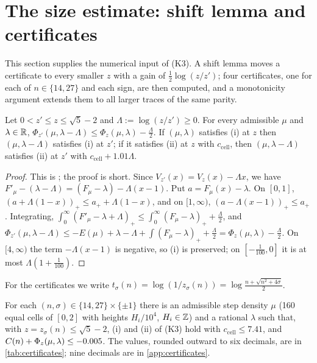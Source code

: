 \section{The size estimate: shift lemma and certificates}\label{sec:size}

This section supplies the numerical input of (K3). A shift lemma moves a certificate to every smaller $z$
with a gain of $\frac12\log(z/z')$; four certificates, one for each of $n\in\{14,27\}$ and each sign,
are then computed, and a monotonicity argument extends them to all larger traces of the same parity.

\begin{lemma}\label{lem:shift}
Let $0<z'\le z\le\sqrt5-2$ and $\Lambda:=\log(z/z')\ge0$. For every admissible $\mu$ and $\lambda\in\mathbb{R}$,
$\Phi_{z'}(\mu,\lambda-\Lambda)\le\Phi_z(\mu,\lambda)-\frac\Lambda2$. If $(\mu,\lambda)$ satisfies (i) at $z$ then
$(\mu,\lambda-\Lambda)$ satisfies (i) at $z'$; if it satisfies (ii) at $z$ with $c_{\mathrm{cell}}$, then
$(\mu,\lambda-\Lambda)$ satisfies (ii) at $z'$ with $c_{\mathrm{cell}}+1.01\Lambda$.
\end{lemma}

\begin{proof}
This is \cite[Lemma~5.5]{Krisman2026units}; the proof is short. Since $V_{z'}(x)=V_z(x)-\Lambda x$, we have
$F'_\mu-(\lambda-\Lambda)=(F_\mu-\lambda)-\Lambda(x-1)$. Put $a=F_\mu(x)-\lambda$. On $[0,1]$,
$(a+\Lambda(1-x))_+\le a_++\Lambda(1-x)$, and on $[1,\infty)$, $(a-\Lambda(x-1))_+\le a_+$. Integrating,
$\int_0^\infty(F'_\mu-\lambda+\Lambda)_+\le\int_0^\infty(F_\mu-\lambda)_++\frac\Lambda2$, and
$\Phi_{z'}(\mu,\lambda-\Lambda)\le-E(\mu)+\lambda-\Lambda+\int(F_\mu-\lambda)_++\frac\Lambda2=\Phi_z(\mu,\lambda)-\frac\Lambda2$.
On $[4,\infty)$ the term $-\Lambda(x-1)$ is negative, so (i) is preserved; on $[-\frac1{100},0]$ it is at most
$\Lambda(1+\frac1{100})$.
\end{proof}

For the certificates we write $t_\sigma(n)=\log(1/z_\sigma(n))=\log\frac{n+\sqrt{n^2+4\sigma}}2$.

\begin{proposition}[certificates]\label{prop:certificates}
For each $(n,\sigma)\in\{14,27\}\times\{\pm1\}$ there is an admissible step density $\mu$ (160 equal cells of
$[0,2]$ with heights $H_i/10^4$, $H_i\in\mathbb{Z}$) and a rational $\lambda$ such that, with $z=z_\sigma(n)\le\sqrt5-2$,
\textup{(i)} and \textup{(ii)} of \textup{(K3)} hold with $c_{\mathrm{cell}}\le7.41$, and
$C(n)+\Phi_z(\mu,\lambda)\le-0.005$. The values, rounded outward to six decimals, are in \cref{tab:certificates}; nine decimals are in \cref{app:certificates}.
\end{proposition}

